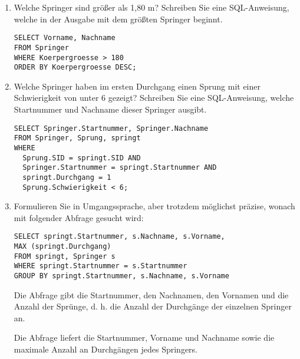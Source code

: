 \documentclass{lehramt-informatik-aufgabe}
\begin{document}
\begin{enumerate}


\item Welche Springer sind größer als 1,80 m? Schreiben Sie eine
SQL-Anweisung, welche in der Ausgabe mit dem größten Springer beginnt.

\begin{antwort}[muster]
\begin{verbatim}
SELECT Vorname, Nachname
FROM Springer
WHERE Koerpergroesse > 180
ORDER BY Koerpergroesse DESC;
\end{verbatim}
\end{antwort}


\item Welche Springer haben im ersten Durchgang einen Sprung mit einer
Schwierigkeit von unter 6 gezeigt? Schreiben Sie eine SQL-Anweisung,
welche Startnummer und Nachname dieser Springer ausgibt.

\begin{antwort}[muster]
\begin{verbatim}
SELECT Springer.Startnummer, Springer.Nachname
FROM Springer, Sprung, springt
WHERE
  Sprung.SID = springt.SID AND
  Springer.Startnummer = springt.Startnummer AND
  springt.Durchgang = 1
  Sprung.Schwierigkeit < 6;
\end{verbatim}
\end{antwort}


\item Formulieren Sie in Umgangssprache, aber trotzdem möglichst
präzise, wonach mit folgender Abfrage gesucht wird:

\begin{verbatim}
SELECT springt.Startnummer, s.Nachname, s.Vorname,
MAX (springt.Durchgang)
FROM springt, Springer s
WHERE springt.Startnummer = s.Startnummer
GROUP BY springt.Startnummer, s.Nachname, s.Vorname
\end{verbatim}

\begin{antwort}[richtig]
Die Abfrage gibt die Startnummer, den Nachnamen, den Vornamen und
die Anzahl der Sprünge, d. h. die Anzahl der Durchgänge der
einzelnen Springer an.
\end{antwort}

\begin{antwort}[muster]
Die Abfrage liefert die Startnummer, Vorname und Nachname sowie die
maximale Anzahl an Durchgängen jedes Springers.
\end{antwort}


\end{enumerate}
\end{document}
